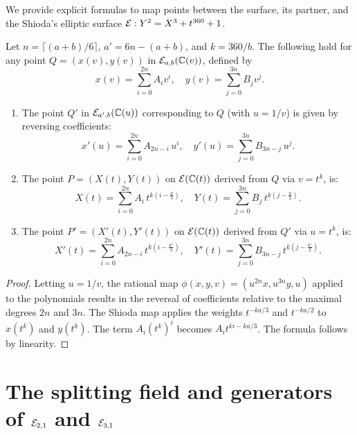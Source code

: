 \documentclass[11pt]{amsart}
\begin{document}
We provide explicit formulas to map points between the surface, its partner, and the Shioda's elliptic  surface ${\mathcal E}: Y^2 = X^3 + t^{360} + 1$.

\begin{lema} 
	\label{lem:poly_transform}
	Let $n = \lceil (a+b)/6 \rceil$,  $a' = 6n-(a+b)$,  	 and $k = 360/b$.
	The following hold for any point $Q = (x(v), y(v))$     in ${\mathcal E}_{a,b}({\mathbb C}(v))$,  defined by
	\[ x(v) = \sum_{i=0}^{2n} A_i v^i, \quad y(v) = \sum_{j=0}^{3n} B_j v^j. \]

	
	\begin{enumerate}
		\item [(i)]  The point $Q'$ in ${\mathcal E}_{a', b}({\mathbb C}(u))$ corresponding to $Q$ (with $u=1/v$) is given by reversing coefficients:
		\[ x'(u) = \sum_{i=0}^{2n} A_{2n-i} \, u^i, \quad y'(u) = \sum_{j=0}^{3n} B_{3n-j} \, u^j. \]
		
		\item [(ii)]   The point $P=(X(t), Y(t))$ on ${\mathcal E}({\mathbb C}(t))$  derived from  $Q$ via $v=t^k$, is:
		\[ X(t) = \sum_{i=0}^{2n} A_i \, t^{k(i - \frac{a}{3})}, \quad Y(t) = \sum_{j=0}^{3n} B_j \, t^{k(j - \frac{a}{2})}. \]
		
		\item [(iii)]   The point $P'=(X'(t), Y'(t))$ on ${\mathcal E}({\mathbb C}(t))$  
		 derived from $Q'$ via $u=t^k$, is:
		\[ X'(t) = \sum_{i=0}^{2n} A_{2n-i} \, t^{k(i - \frac{a'}{3})}, \quad Y'(t) = \sum_{j=0}^{3n} B_{3n-j} \, t^{k(j - \frac{a'}{2})}. \]
	\end{enumerate}
\end{lema}

\begin{proof}
	Letting $u=1/v$, the rational map $\phi(x,y,v) = (u^{2n}x, u^{3n}y,u)$ applied to the polynomials results in the reversal of coefficients relative to the maximal degrees $2n$ and $3n$. 
	The Shioda map applies the weights $t^{-ka/3}$ and $t^{-ka/2}$ to $x(t^k)$ and $y(t^k)$. The term $A_i (t^k)^i$ becomes $A_i t^{ki - ka/3}$. The formula follows by linearity.
\end{proof}


 


 



 \section{The splitting field and generators of ${\mathcal E}_{2,1}$ and ${\mathcal E}_{3,1}$}
\label{A2-(2,1)}
\end{document}
